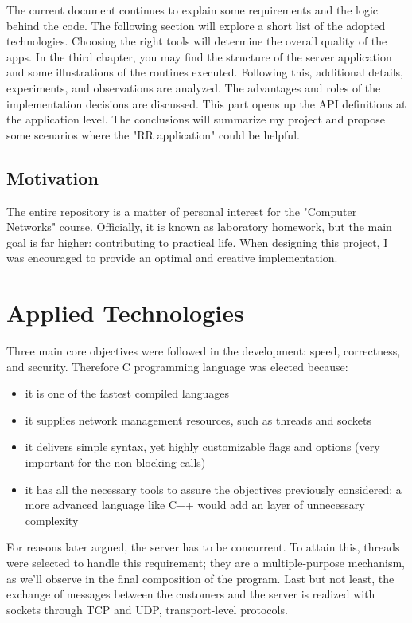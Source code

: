 \documentclass[runningheads]{llncs}
\begin{document}
The current document continues to explain some requirements and the logic behind the code. The following section will explore a short list of the adopted technologies. Choosing the right tools will determine the overall quality of the apps. In the third chapter, you may find the structure of the server application and some illustrations of the routines executed. Following this, additional details, experiments, and observations are analyzed. The advantages and roles of the implementation decisions are discussed. This part opens up the API definitions at the application level. The conclusions will summarize my project and propose some scenarios where the "RR application" could be helpful.

\subsection{Motivation}

The entire repository is a matter of personal interest for the "Computer Networks" course. Officially, it is known as laboratory homework, but the main goal is far higher: contributing to practical life. When designing this project, I was encouraged to provide an optimal and creative implementation.

\section{Applied Technologies}

Three main core objectives were followed in the development: speed, correctness, and security. Therefore C programming language was elected because:
\begin{itemize}
    \item it is one of the fastest compiled languages
    \item it supplies network management resources, such as threads and sockets
    \item it delivers simple syntax, yet highly customizable flags and options (very important for the non-blocking calls)
    \item it has all the necessary tools to assure the objectives previously considered; a more advanced language like C++ would add an layer of unnecessary complexity
\end{itemize}

For reasons later argued, the server has to be concurrent. To attain this, threads were selected to handle this requirement; they are a multiple-purpose mechanism, as we'll observe in the final composition of the program. Last but not least, the exchange of messages between the customers and the server is realized with sockets through TCP and UDP, transport-level protocols.
\end{document}
